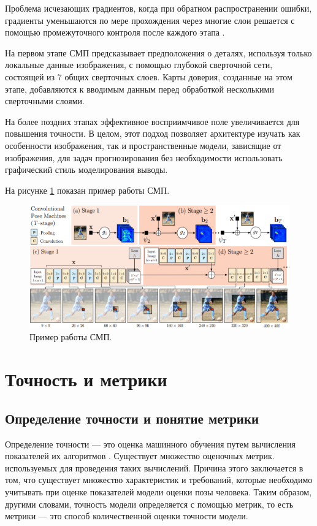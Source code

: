 Проблема исчезающих градиентов, когда при обратном распространении ошибки, градиенты уменьшаются по мере прохождения через многие слои решается с помощью промежуточного контроля после каждого этапа \cite{wei2016cpm}.

На первом этапе СМП предсказывает предположения о деталях, используя только локальные данные изображения, с помощью глубокой сверточной сети, состоящей из 7 общих сверточных слоев. Карты доверия, созданные на этом этапе, добавляются к вводимым данным перед обработкой несколькими сверточными слоями.

На более поздних этапах эффективное восприимчивое поле увеличивается для повышения точности. 
В целом, этот подход позволяет архитектуре изучать как особенности изображения, так и пространственные модели, зависящие от изображения, для задач прогнозирования без необходимости использовать графический стиль моделирования выводы.

На рисунке \ref{img:cpm} показан пример работы СМП.
\begin{figure}[ht!]
	\centering
	\includegraphics[width=1\linewidth]{assets/cpm.png}
	\caption{Пример работы СМП.}
	\label{img:cpm}
\end{figure}

\section{Точность и метрики}

\subsection{Определение точности и понятие метрики}

Определение точности --- это оценка машинного обучения путем вычисления показателей их алгоритмов \cite{vyugin}. 
Существует множество оценочных метрик. используемых для проведения таких вычислений.
Причина этого заключается в том, что существует множество характеристик и требований, которые необходимо учитывать при оценке показателей модели оценки позы человека.
Таким образом, другими словами, точность модели определяется с помощью метрик, то есть метрики --- это способ количественной оценки точности модели.

